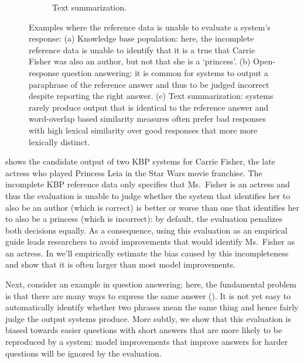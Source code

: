 \begin{figure}
\begin{subfigure}{0.65\textwidth}
    \caption{\label{fig:intro:example-summarization} Text summarization. }
  \end{subfigure}
  \caption[Examples highlighting the limitations of incomplete evaluation sets]{\label{fig:intro:examples} Examples where the reference data is unable to evaluate a system's response:
  (a) Knowledge base population: here, the incomplete reference data is unable to identify that it is a true that Carrie Fisher was also an author, but not that she is a `princess'.
  (b) Open-response question answering: it is common for systems to output a paraphrase of the reference answer and thus to be judged incorrect despite reporting the right answer.
  (c) Text summarization: systems rarely produce output that is identical to the reference answer and word-overlap based similarity measures often prefer bad responses with high lexical similarity over good responses that more more lexically distinct.  
  }
\end{figure}

 shows the candidate output of two KBP systems for Carrie Fisher, the late actress who played Princess Leia in the Star Wars movie franchise.
The incomplete KBP reference data only specifies that Ms.\ Fisher is an actress and thus the evaluation is unable to judge whether the system that identifies her to also be an author (which is correct) is better or worse than one that identifies her to also be a princess (which is incorrect): by default, the evaluation penalizes both decisions equally.
As a consequence, using this evaluation as an empirical guide leads researchers to avoid improvements that would identify Ms.\ Fisher as an actress.
In  we'll empirically estimate the bias caused by this incompleteness and show that it is often larger than most model improvements.

Next, consider an example in question answering:
  here, the fundamental problem is that there are many ways to express the same answer ().
It is not yet easy to automatically identify whether two phrases mean the same thing and hence fairly judge the output systems produce.
More subtly, we show that this evaluation is biased towards easier questions with short answers that are more likely to be reproduced by a system:
  model improvements that improve answers for harder questions will be ignored by the evaluation.


